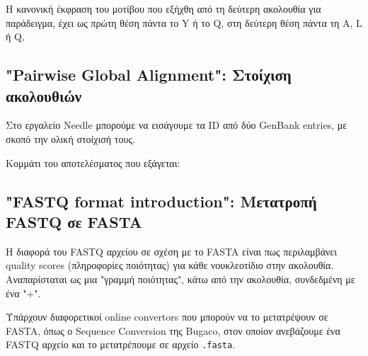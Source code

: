     Η κανονική έκφραση του μοτίβου που εξήχθη από τη δεύτερη ακολουθία για παράδειγμα, έχει ως πρώτη θέση πάντα το Y ή το Q, στη δεύτερη θέση πάντα τη A, L ή Q,

    \subsection{"Pairwise Global Alignment": Στοίχιση ακολουθιών}
        Στο εργαλείο Needle \cite{Needle} μπορούμε να εισάγουμε τα ID από δύο GenBank entries, με σκοπό την ολική στοίχισή τους.

        Κομμάτι του αποτελέσματος που εξάγεται:
            \begin{graycomment} \footnotesize
            \begin{verbatim}
%# Length: 142
%# Identity:     122/142 (85.9%)
%# Similarity:   131/142 (92.3%)
%# Gaps:           0/142 ( 0.0%)
%# Score: 648.0 \end{verbatim}
            \end{graycomment}

    \subsection{"FASTQ format introduction": Μετατροπή FASTQ σε FASTA}
        Η διαφορά του FASTQ αρχείου σε σχέση με το FASTA είναι πως περιλαμβάνει quality scores (πληροφορίες ποιότητας) για κάθε νουκλεοτίδιο στην ακολουθία.
        Αναπαρίσταται ως μια "γραμμή ποιότητας", κάτω από την ακολουθία, συνδεδμένη με ένα "+".

        Υπάρχουν διαφορετικοί online convertors που μπορούν να το μετατρέψουν σε FASTA, όπως ο Sequence Conversion της Bugaco, \cite{BugacoConversion} στον οποίον ανεβάζουμε ένα FASTQ αρχείο και το μετατρέπουμε σε αρχείο \texttt{.fasta}.

